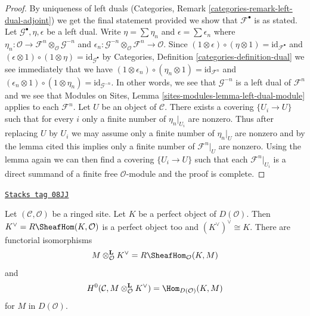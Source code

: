 \begin{proof}
By uniqueness of left duals
(Categories, Remark \ref{categories-remark-left-dual-adjoint})
we get the final statement provided we show that $\mathcal{F}^\bullet$
is as stated. Let $\mathcal{G}^\bullet, \eta, \epsilon$ be a left dual.
Write $\eta = \sum \eta_n$ and $\epsilon = \sum \epsilon_n$
where $\eta_n : \mathcal{O} \to
\mathcal{F}^n \otimes_\mathcal{O} \mathcal{G}^{-n}$
and
$\epsilon_n : \mathcal{G}^{-n} \otimes_\mathcal{O} \mathcal{F}^n
\to \mathcal{O}$. Since
$(1 \otimes \epsilon) \circ (\eta \otimes 1) = \text{id}_{\mathcal{F}^\bullet}$
and
$(\epsilon \otimes 1) \circ (1 \otimes \eta) = \text{id}_{\mathcal{G}^\bullet}$
by Categories, Definition \ref{categories-definition-dual} we see immediately
that we have
$(1 \otimes \epsilon_n) \circ (\eta_n \otimes 1) = \text{id}_{\mathcal{F}^n}$
and
$(\epsilon_n \otimes 1) \circ (1 \otimes \eta_n) =
\text{id}_{\mathcal{G}^{-n}}$.
In other words, we see that $\mathcal{G}^{-n}$ is a left dual of
$\mathcal{F}^n$ and we see that
Modules on Sites, Lemma \ref{sites-modules-lemma-left-dual-module}
applies to each $\mathcal{F}^n$. Let $U$ be an object of $\mathcal{C}$.
There exists a covering $\{U_i \to U\}$ such that for every
$i$ only a finite number of $\eta_n|_{U_i}$ are nonzero.
Thus after replacing $U$ by $U_i$ we may assume only a finite
number of $\eta_n|_U$ are nonzero and by the lemma cited
this implies only a finite number of $\mathcal{F}^n|_U$ are
nonzero. Using the lemma again we can then find a covering
$\{U_i \to U\}$ such that each
$\mathcal{F}^n|_{U_i}$ is a direct summand of a finite
free $\mathcal{O}$-module and the proof is complete.
\end{proof}

\begin{lemma}
\label{sites-cohomology-lemma-dual-perfect-complex}
\href{https://stacks.math.columbia.edu/tag/08JJ}{\texttt{Stacks tag 08JJ}}

Let $(\mathcal{C}, \mathcal{O})$ be a ringed site.
Let $K$ be a perfect object of $D(\mathcal{O})$.
Then $K^\vee = R\SheafHom(K, \mathcal{O})$ is a
perfect object too and $(K^\vee)^\vee \cong K$. There are
functorial isomorphisms
$$
M \otimes^\mathbf{L}_\mathcal{O} K^\vee = R\SheafHom_\mathcal{O}(K, M)
$$
and
$$
H^0(\mathcal{C}, M \otimes^\mathbf{L}_\mathcal{O} K^\vee) =
\Hom_{D(\mathcal{O})}(K, M)
$$
for $M$ in $D(\mathcal{O})$.
\end{lemma}

